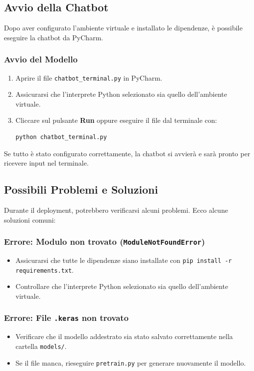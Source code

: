 \documentclass[12pt, letterpaper]{article}
\begin{document}
\subsection{Avvio della Chatbot}

Dopo aver configurato l'ambiente virtuale e installato le dipendenze, è possibile eseguire la chatbot da PyCharm.

\subsubsection{Avvio del Modello}

\begin{enumerate}
	\item Aprire il file \texttt{chatbot\_terminal.py} in PyCharm.
	\item Assicurarsi che l'interprete Python selezionato sia quello dell'ambiente virtuale.
	\item Cliccare sul pulsante \textbf{Run} oppure eseguire il file dal terminale con:
	\begin{lstlisting}
python chatbot_terminal.py
	\end{lstlisting}
\end{enumerate}
Se tutto è stato configurato correttamente, la chatbot si avvierà e sarà pronto per ricevere input nel terminale.

\subsection{Possibili Problemi e Soluzioni}

Durante il deployment, potrebbero verificarsi alcuni problemi. Ecco alcune soluzioni comuni:

\subsubsection{Errore: Modulo non trovato (\texttt{ModuleNotFoundError})}
\begin{itemize}
	\item Assicurarsi che tutte le dipendenze siano installate con \texttt{pip install -r requirements.txt}.
	\item Controllare che l'interprete Python selezionato sia quello dell'ambiente virtuale.
\end{itemize}

\subsubsection{Errore: File \texttt{.keras} non trovato}
\begin{itemize}
	\item Verificare che il modello addestrato sia stato salvato correttamente nella cartella \texttt{models/}.
	\item Se il file manca, rieseguire \texttt{pretrain.py} per generare nuovamente il modello.
\end{itemize}
\end{document}
